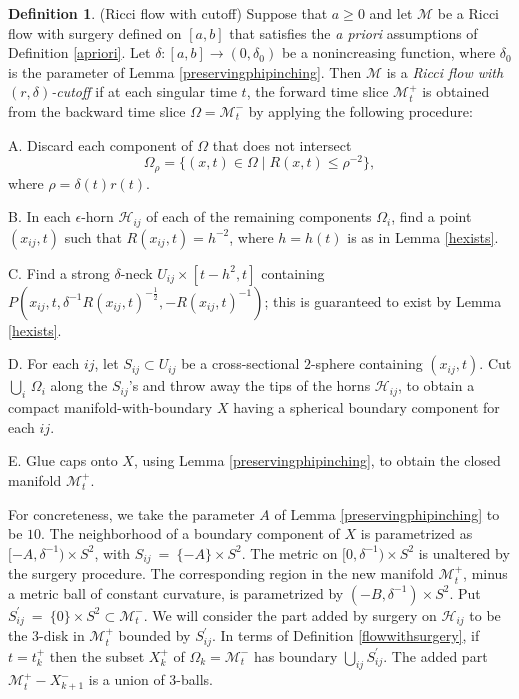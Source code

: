 \documentclass[12pt]{amsart}
\newcommand{\h}{{\mathcal H}}
\newcommand{\M}{{\mathcal M}}
\newcommand{\Om}{\Omega}
\newcommand{\de}{\delta}
\newcommand{\eps}{\epsilon}
\newcommand{\ra}{\rightarrow}
\numberwithin{equation}{section}
\theoremstyle{plain}
\theoremstyle{definition}
\newtheorem{definition}[equation]{Definition}
\theoremstyle{remark}
\begin{document}
\begin{definition}(Ricci flow with cutoff)
\label{rdeltacutoffflowdef}
Suppose that $a\geq 0$ and let $\M$ be a Ricci flow with surgery 
defined on $[a,b]$ that satisfies the {\it a priori}
assumptions of Definition \ref{apriori}.
Let $\de:[a,b]\ra (0,\delta_0)$ be a nonincreasing function, where
$\delta_0$ is the parameter of Lemma \ref{preservingphipinching}.
Then $\M$ is a 
{\em  Ricci flow with $(r, \de)$-cutoff} if 
at each singular time $t$, the forward time slice
$\M_{t}^+$ is obtained from the backward time slice $\Omega = 
\M_{t}^-$
by applying the following procedure:

A.  Discard each component of $\Omega$ that does not
intersect
\begin{equation}
\Om_{\rho} = \{(x,t)\in \Omega \mid R(x,t)\leq\rho^{-2}\},
\end{equation}
where $\rho= \de(t)r(t)$.
 
B. In each $\eps$-horn 
$\h_{ij}$ of each of the remaining components
$\Om_i$, find a point $(x_{ij},t)$
such that $R(x_{ij},t)=h^{-2}$, where 
$h=h(t)$
is as in Lemma \ref{hexists}.
  
C. Find a strong $\de$-neck $U_{ij}\times [t-h^2,t]$ 
containing 
$P(x_{ij},t,\de^{-1}R(x_{ij},t)^{-\frac12},-R(x_{ij},t)^{-1})$;  this 
is guaranteed to exist by Lemma \ref{hexists}.
  
D.  For each $ij$, let $S_{ij}\subset U_{ij}$ be
a cross-sectional $2$-sphere containing $(x_{ij},t)$.
Cut $\bigcup_i\,\Om_i$ 
along the $S_{ij}$'s and throw away the tips of the horns
$\h_{ij}$,
to obtain a compact manifold-with-boundary $X$ having a 
spherical boundary component for each $ij$.

E. Glue caps onto $X$, using Lemma \ref{preservingphipinching},  
to obtain the closed manifold $\M_{t}^+$.
\end{definition}

For concreteness, we take the parameter
$A$ of Lemma \ref{preservingphipinching} to be $10$.
The neighborhood of a boundary
component of $X$ is parametrized as $[-A, \delta^{-1}) \times S^2$,
with $S_{ij} \: = \: \{-A \} \times S^2$.
The metric on $[0, \delta^{-1}) \times S^2$ is unaltered by the surgery procedure.
The corresponding region in the new manifold $\M_{t}^+$, minus 
a metric ball of constant curvature, is
parametrized by $(-B, \delta^{-1}) \times S^2$.
Put $S_{ij}^\prime \: = \: \{0\} \times S^2 \subset \M_{t}^-$.
We will consider the part added by surgery on $\h_{ij}$
to be the $3$-disk in $\M_{t}^+$ bounded by $S_{ij}^\prime$. 
In terms of Definition \ref{flowwithsurgery}, if $t = t_k^+$ then
the subset $X_k^+$ of $\Omega_k = \M_{t}^-$ has
boundary $\bigcup_{ij} S_{ij}^\prime$. The added part
$\M_{t}^+ - X_{k+1}^-$ is a union of $3$-balls.
\end{document}
